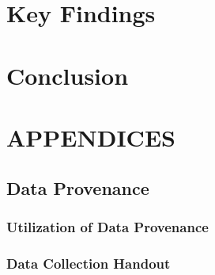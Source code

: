 \documentclass[]{article}
\begin{document}
\section{Key Findings}
\label{sec:findings}

\section{Conclusion}
\label{sec:conclusion}

\newpage



\newpage

\section{APPENDICES}
\label{sec:appendix}

\subsection{Data Provenance}
\label{sec:appendix-data-provenance}

\subsubsection{Utilization of Data Provenance}
\label{sec:appendix-provenance-explained}

\newpage

\subsubsection{Data Collection Handout}
\label{sec:appendix-data-handout}
\end{document}
